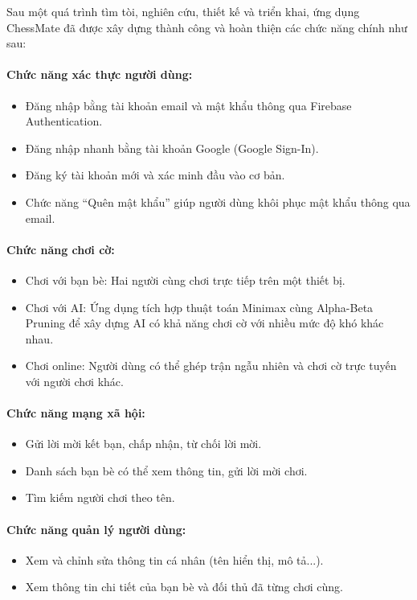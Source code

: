 \documentclass[a4paper,12pt]{article}
\begin{document}
\justify
\noindent Sau một quá trình tìm tòi, nghiên cứu, thiết kế và triển khai, ứng dụng ChessMate đã được xây dựng thành công và hoàn thiện các chức năng chính như sau:

\paragraph{\textbf{Chức năng xác thực người dùng:}} %
\begin{itemize}[label=·]
    \item Đăng nhập bằng tài khoản email và mật khẩu thông qua Firebase Authentication.
    \item Đăng nhập nhanh bằng tài khoản Google (Google Sign-In).
    \item Đăng ký tài khoản mới và xác minh đầu vào cơ bản.
    \item Chức năng “Quên mật khẩu” giúp người dùng khôi phục mật khẩu thông qua email.
\end{itemize}

\paragraph{\textbf{Chức năng chơi cờ:}} %
\begin{itemize}[label=·]
    \item Chơi với bạn bè: Hai người cùng chơi trực tiếp trên một thiết bị.
    \item Chơi với AI: Ứng dụng tích hợp thuật toán Minimax cùng Alpha-Beta Pruning để xây dựng AI có khả năng chơi cờ với nhiều mức độ khó khác nhau.
    \item Chơi online: Người dùng có thể ghép trận ngẫu nhiên và chơi cờ trực tuyến với người chơi khác.
\end{itemize}

\paragraph{\textbf{Chức năng mạng xã hội:}} %
\begin{itemize}[label=·]
    \item Gửi lời mời kết bạn, chấp nhận, từ chối lời mời.
    \item Danh sách bạn bè có thể xem thông tin, gửi lời mời chơi.
    \item Tìm kiếm người chơi theo tên.
\end{itemize}

\paragraph{\textbf{Chức năng quản lý người dùng:}} %
\begin{itemize}[label=·]
    \item Xem và chỉnh sửa thông tin cá nhân (tên hiển thị, mô tả...).
    \item Xem thông tin chi tiết của bạn bè và đối thủ đã từng chơi cùng.
\end{itemize}
\end{document}
